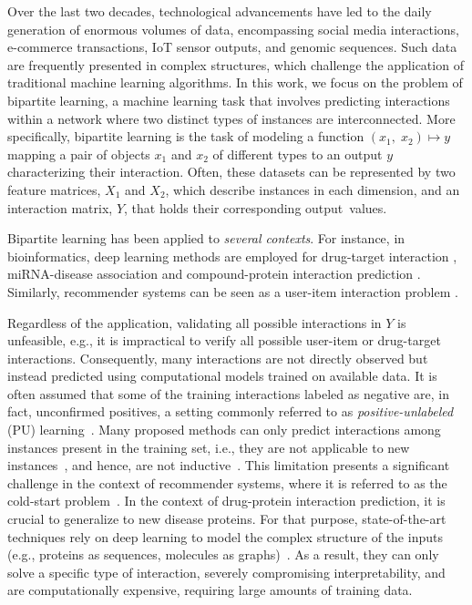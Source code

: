 \documentclass[letterpaper]{article}
\begin{document}
Over the last two decades, technological advancements have led to the daily generation of enormous volumes of data, encompassing social media interactions, e-commerce transactions, IoT sensor outputs, and genomic sequences.
Such data are frequently presented in complex structures, which challenge the application of traditional machine learning algorithms.
In this work, we focus on the problem of bipartite learning, a machine learning task that involves predicting interactions within a network where two distinct types of instances are interconnected.
More specifically, bipartite learning is the task of modeling a function $(x_1,\; x_2) \mapsto y$ mapping a pair of objects $x_1$ and $x_2$ of different types to an output $y$ characterizing their interaction. Often, these datasets can be represented by two feature matrices, $X_1$ and $X_2$, which describe instances in each dimension, and an interaction matrix, $Y$, that holds their corresponding output~values.


Bipartite learning has been applied to \emph{several contexts}.
For instance, in bioinformatics, deep learning methods are employed for drug-target interaction \cite{huang_moltrans_2020,lin2023comprehensive, bagherian2021machine,liu2024ssldti}, miRNA-disease association \cite{tian2024mgcnss} and compound-protein interaction prediction \cite{tsubaki2019compound}.
Similarly, recommender systems can be seen as a user-item interaction problem \cite{aggarwal2016recommender}.

Regardless of the application, validating all possible interactions in $Y$ is unfeasible, e.g., it is impractical to verify all possible user-item or drug-target interactions. Consequently, many interactions are not directly observed but instead predicted using computational models trained on available data. It is often assumed that some of the training interactions labeled as negative are, in fact, unconfirmed positives, a setting commonly referred to as \emph{positive-unlabeled} (PU) learning~\cite{bekker2020learning}.
Many proposed methods can only predict interactions among instances present in the training set, i.e., they are not applicable to new instances~\cite{park_flaws_2012,schrynemackers_protocols_2013,pahikkala_toward_2015}, and hence, are not inductive~\cite{chapelle_semi-supervised_2006}. This limitation presents a significant challenge in the context of recommender systems, where it is referred to as the cold-start problem~\cite{gharahighehi_addressing_2022}. In the context of drug-protein interaction prediction, it is crucial to generalize to new disease proteins.
For that purpose, state-of-the-art techniques rely on deep learning to model the complex structure of the inputs (e.g., proteins as sequences, molecules as graphs)~\cite{huang_moltrans_2020,dehghan_tripletmultidti_2023}. As a result, they can only solve a specific type of interaction, severely compromising interpretability, and are computationally expensive, requiring large amounts of training data.
\end{document}
